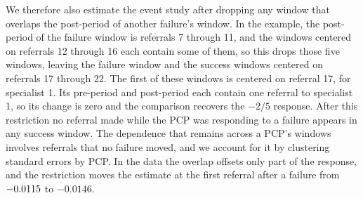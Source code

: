 \documentclass[12pt]{article}
\newcommand{\rereferESFirstSutva}{-0.0146}
\begin{document}
We therefore also estimate the event study after dropping any window that overlaps the post-period of another failure's window. In the example, the post-period of the failure window is referrals 7 through 11, and the windows centered on referrals 12 through 16 each contain some of them, so this drops those five windows, leaving the failure window and the success windows centered on referrals 17 through 22. The first of these windows is centered on referral 17, for specialist 1. Its pre-period and post-period each contain one referral to specialist 1, so its change is zero and the comparison recovers the $-2/5$ response. After this restriction no referral made while the PCP was responding to a failure appears in any success window. The dependence that remains across a PCP's windows involves referrals that no failure moved, and we account for it by clustering standard errors by PCP. In the data the overlap offsets only part of the response, and the restriction moves the estimate at the first referral after a failure from $-0.0115{}$ to $\rereferESFirstSutva{}$.
\end{document}
